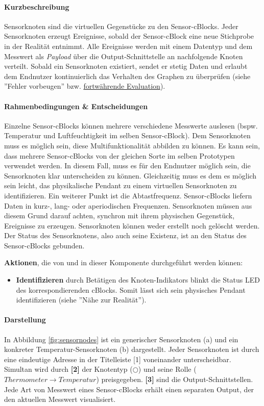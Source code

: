 \paragraph{Kurzbeschreibung}  Sensorknoten sind die virtuellen Gegenstücke zu den Sensor-cBlocks. Jeder Sensorknoten erzeugt Ereignisse, sobald der Sensor-cBlock eine neue Stichprobe in der Realität entnimmt. Alle Ereignisse werden mit einem Datentyp und dem Messwert als \textit{Payload} über die Output-Schnittstelle an nachfolgende Knoten verteilt. Sobald ein Sensorknoten existiert, sendet er stetig Daten und erlaubt dem Endnutzer kontinuierlich das Verhalten des Graphen zu überprüfen (siehe ''Fehler vorbeugen'' bzw. \hyperref[tab:cognitivedimensions]{fortwährende Evaluation}).

\paragraph{Rahmenbedingungen \& Entscheidungen} Einzelne Sensor-cBlocks können mehrere verschiedene Messwerte auslesen (bspw. Temperatur und Luftfeuchtigkeit im selben Sensor-cBlock). Dem Sensorknoten muss es möglich sein, diese Multifunktionalität abbilden zu können. Es kann sein, dass mehrere Sensor-cBlocks von der gleichen Sorte im selben Prototypen verwendet werden. In diesem Fall, muss es für den Endnutzer möglich sein, die Sensorknoten klar unterscheiden zu können. Gleichzeitig muss es dem es möglich sein leicht, das  physikalische Pendant zu einem virtuellen Sensorknoten zu identifizieren. Ein weiterer Punkt ist die Abtastfrequenz. Sensor-cBlocks liefern Daten in kurz-, lang- oder aperiodischen Frequenzen. Sensorknoten müssen aus diesem Grund darauf achten, synchron mit ihrem physischen Gegenstück, Ereignisse zu erzeugen. Sensorknoten können weder erstellt noch gelöscht werden. Der Status des Sensorknotens, also auch seine Existenz, ist an den Status des Sensor-cBlocks gebunden.

\textbf{Aktionen}, die von und in dieser Komponente durchgeführt werden können: 
\begin{itemize}
    \item \textbf{Identifizieren} durch Betätigen des Knoten-Indikators blinkt die Status LED des korrespondierenden cBlocks. Somit lässt sich sein physisches Pendant identifizieren (siehe ''Nähe zur Realität'').
\end{itemize}

\paragraph{Darstellung} In Abbildung \ref{fig:sensornodes} ist ein generischer Sensorknoten (a) und ein konkreter Temperatur-Sensorknoten (b) dargestellt. Jeder Sensorknoten ist durch eine eindeutige Adresse in der Titelleiste [1] voneinander unterscheidbar. Simultan wird durch \textbf{[2]} der Knotentyp ($\bigcirc$) und seine Rolle ($Thermometer \rightarrow Temperatur$) preisgegeben. \textbf{[3]} sind die Output-Schnittstellen. Jede Art von Messwert eines Sensor-cBlocks erhält einen separaten Output, der den aktuellen Messwert visualisiert. 

